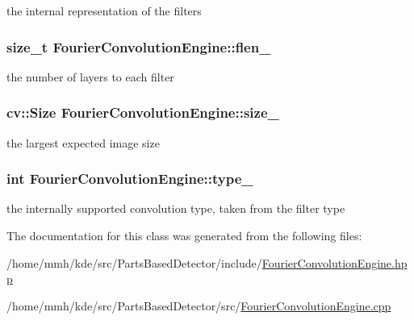 the internal representation of the filters 

\hypertarget{classFourierConvolutionEngine_ab4322f51ce4a18ab5b7439abb5c96aef}{
\subsubsection[{flen\-\_\-}]{\setlength{\rightskip}{0pt plus 5cm}size\-\_\-t Fourier\-Convolution\-Engine\-::flen\-\_\-\hspace{0.3cm}{\ttfamily [private]}}}\label{classFourierConvolutionEngine_ab4322f51ce4a18ab5b7439abb5c96aef}


the number of layers to each filter 

\hypertarget{classFourierConvolutionEngine_a2375ea1729ad2fe45fe6204130f3f39f}{
\subsubsection[{size\-\_\-}]{\setlength{\rightskip}{0pt plus 5cm}cv\-::\-Size Fourier\-Convolution\-Engine\-::size\-\_\-\hspace{0.3cm}{\ttfamily [private]}}}\label{classFourierConvolutionEngine_a2375ea1729ad2fe45fe6204130f3f39f}


the largest expected image size 

\hypertarget{classFourierConvolutionEngine_a3e213d98d690b295eaa2866618f17933}{
\subsubsection[{type\-\_\-}]{\setlength{\rightskip}{0pt plus 5cm}int Fourier\-Convolution\-Engine\-::type\-\_\-\hspace{0.3cm}{\ttfamily [private]}}}\label{classFourierConvolutionEngine_a3e213d98d690b295eaa2866618f17933}


the internally supported convolution type, taken from the filter type 



The documentation for this class was generated from the following files\-:\begin{DoxyCompactItemize}
\item 
/home/mmh/kde/src/\-Parts\-Based\-Detector/include/\hyperlink{FourierConvolutionEngine_8hpp}{Fourier\-Convolution\-Engine.\-hpp}\item 
/home/mmh/kde/src/\-Parts\-Based\-Detector/src/\hyperlink{FourierConvolutionEngine_8cpp}{Fourier\-Convolution\-Engine.\-cpp}\end{DoxyCompactItemize}
